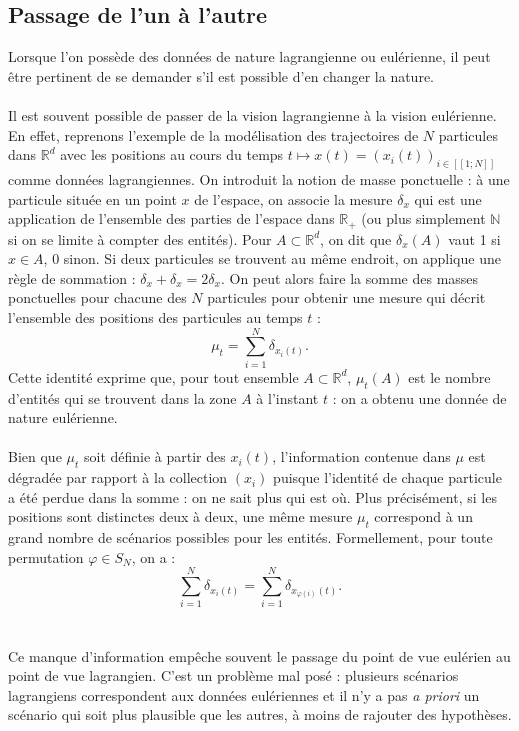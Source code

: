 \documentclass[12pt]{article}
\newcommand{\N}{\mathbb{N}}
\newcommand{\R}{\mathbb{R}}
\newcommand{\Rd}{\mathbb{R}^d}
\newcommand{\dcrochetg}{[\![}
\newcommand{\dcrochetd}{]\!]}
\begin{document}
\subsection{Passage de l'un à l'autre}
Lorsque l'on possède des données de nature lagrangienne ou eulérienne, il peut être pertinent de se demander s'il est possible d'en changer la nature.\\
\\
Il est souvent possible de passer de la vision lagrangienne à la vision eulérienne. En effet, reprenons l'exemple de la modélisation des trajectoires de $N$ particules dans $\Rd$ avec les positions au cours du temps $t \mapsto x(t) = (x_i(t))_{i\in\dcrochetg1;N\dcrochetd}$ comme données lagrangiennes. On introduit la notion de masse ponctuelle : à une particule située en un point $x$ de l'espace, on associe la mesure $\delta_x$ qui est une application de l'ensemble des parties de l'espace dans $\R_+$ (ou plus simplement $\N$ si on se limite à compter des entités). Pour $A  \subset \R^d$, on dit que $\delta_x(A)$ vaut 1 si $x \in A$, 0 sinon. Si deux particules se trouvent au même endroit, on applique une règle de sommation : $\delta_x + \delta_x = 2\delta_x$. On peut alors faire la somme des masses ponctuelles pour chacune des $N$ particules pour obtenir une mesure qui décrit l'ensemble des positions des particules au temps $t$ : 
\[ \mu_t = \sum_{i=1}^{N} \delta_{x_i(t)}.\] 
Cette identité exprime que, pour tout ensemble $A \subset \Rd$, $\mu_t(A)$ est le nombre d'entités qui se trouvent dans la zone $A$ à l'instant $t$ : on a obtenu une donnée de nature eulérienne.\\
\\
Bien que $\mu_t$ soit définie à partir des $x_i(t)$, l'information contenue dans $\mu$ est dégradée par rapport à la collection $(x_i)$ puisque l'identité de chaque particule a été perdue dans la somme : on ne sait plus qui est où. Plus précisément, si les positions sont distinctes deux à deux, une même mesure $\mu_t$ correspond à un grand nombre de scénarios possibles pour les entités. Formellement, pour toute permutation $\varphi \in S_N$, on a : \[ \sum_{i=1}^{N} \delta_{x_i(t)} = \sum_{i=1}^{N} \delta_{x_{\varphi(i)}(t)}.\]\\
\\
Ce manque d'information empêche souvent le passage du point de vue eulérien au point de vue lagrangien. C'est un problème mal posé : plusieurs scénarios lagrangiens correspondent aux données eulériennes et il n'y a pas \textit{a priori}  un scénario qui soit plus plausible que les autres, à moins de rajouter des hypothèses.\\
\end{document}
